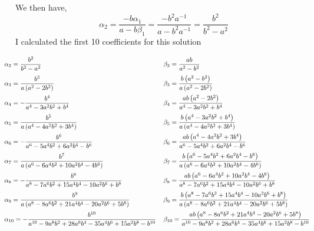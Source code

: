 We then have,
\[ \alpha_2 = \frac{-b \alpha_1}{a-b \beta_1} = \frac{-b^2 a^{-1}}{a-b^2 a^{-1}} = \frac{b^2}{b^2 - a^2} \]
I calculated the first 10 coefficients for this solution
\[ \hspace{-2em}\everymath{\displaystyle}\arraycolsep=2.8pt\def\arraystretch{2.5}\begin{array}{lcl}
\alpha_2 = \frac{b^2}{b^2 - a^2} & & \beta_{2} = \frac{a b}{a^{2} - b^{2}}\\
\alpha_{3} = \frac{b^{3}}{a \left(a^{2} - 2 b^{2}\right)}& & \beta_{3} = \frac{b \left(a^{2} - b^{2}\right)}{a \left(a^{2} - 2 b^{2}\right)}\\
\alpha_{4} = - \frac{b^{4}}{a^{4} - 3 a^{2} b^{2} + b^{4}}& & \beta_{4} = \frac{a b \left(a^{2} - 2 b^{2}\right)}{a^{4} - 3 a^{2} b^{2} + b^{4}}\\
\alpha_{5} = \frac{b^{5}}{a \left(a^{4} - 4 a^{2} b^{2} + 3 b^{4}\right)}& & \beta_{5} = \frac{b \left(a^{4} - 3 a^{2} b^{2} + b^{4}\right)}{a \left(a^{4} - 4 a^{2} b^{2} + 3 b^{4}\right)}\\
\alpha_{6} = - \frac{b^{6}}{a^{6} - 5 a^{4} b^{2} + 6 a^{2} b^{4} - b^{6}}& & \beta_{6} = \frac{a b \left(a^{4} - 4 a^{2} b^{2} + 3 b^{4}\right)}{a^{6} - 5 a^{4} b^{2} + 6 a^{2} b^{4} - b^{6}}\\
\alpha_{7} = \frac{b^{7}}{a \left(a^{6} - 6 a^{4} b^{2} + 10 a^{2} b^{4} - 4 b^{6}\right)}& & \beta_{7} = \frac{b \left(a^{6} - 5 a^{4} b^{2} + 6 a^{2} b^{4} - b^{6}\right)}{a \left(a^{6} - 6 a^{4} b^{2} + 10 a^{2} b^{4} - 4 b^{6}\right)}\\
\alpha_{8} = - \frac{b^{8}}{a^{8} - 7 a^{6} b^{2} + 15 a^{4} b^{4} - 10 a^{2} b^{6} + b^{8}}& & \beta_{8} = \frac{a b \left(a^{6} - 6 a^{4} b^{2} + 10 a^{2} b^{4} - 4 b^{6}\right)}{a^{8} - 7 a^{6} b^{2} + 15 a^{4} b^{4} - 10 a^{2} b^{6} + b^{8}}\\
\alpha_{9} = \frac{b^{9}}{a \left(a^{8} - 8 a^{6} b^{2} + 21 a^{4} b^{4} - 20 a^{2} b^{6} + 5 b^{8}\right)}& & \beta_{9} = \frac{b \left(a^{8} - 7 a^{6} b^{2} + 15 a^{4} b^{4} - 10 a^{2} b^{6} + b^{8}\right)}{a \left(a^{8} - 8 a^{6} b^{2} + 21 a^{4} b^{4} - 20 a^{2} b^{6} + 5 b^{8}\right)}\\
\alpha_{10} = - \frac{b^{10}}{a^{10} - 9 a^{8} b^{2} + 28 a^{6} b^{4} - 35 a^{4} b^{6} + 15 a^{2} b^{8} - b^{10}}& & \beta_{10} = \frac{a b \left(a^{8} - 8 a^{6} b^{2} + 21 a^{4} b^{4} - 20 a^{2} b^{6} + 5 b^{8}\right)}{a^{10} - 9 a^{8} b^{2} + 28 a^{6} b^{4} - 35 a^{4} b^{6} + 15 a^{2} b^{8} - b^{10}}
\end{array} \]

